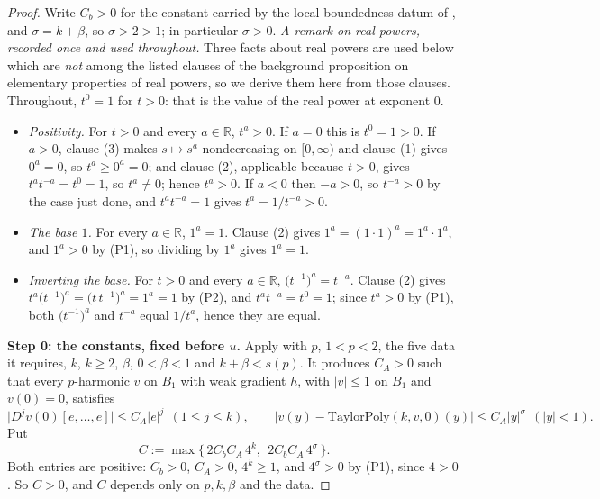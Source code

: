 \begin{proof}
Write $C_b>0$ for the constant carried by the local boundedness datum of
, and $\sigma=k+\beta$, so $\sigma>2>1$; in particular
$\sigma>0$.
\medskip\noindent\emph{A remark on real powers, recorded once and used throughout.}  Three
facts about real powers are used below which are \emph{not} among the listed clauses of the
background proposition on elementary properties of real powers, so we derive them here from
those clauses.  Throughout, $t^{0}=1$ for $t>0$: that is the value of the real power at
exponent $0$.
\begin{itemize}
\item[(P1)] \emph{Positivity.}  For $t>0$ and every $a\in\mathbb{R}$, $t^{a}>0$.  If $a=0$ this
is $t^{0}=1>0$.  If $a>0$, clause (3) makes $s\mapsto s^{a}$ nondecreasing on $[0,\infty)$ and
clause (1) gives $0^{a}=0$, so $t^{a}\ge0^{a}=0$; and clause (2), applicable because $t>0$,
gives $t^{a}t^{-a}=t^{0}=1$, so $t^{a}\ne0$; hence $t^{a}>0$.  If $a<0$ then $-a>0$, so
$t^{-a}>0$ by the case just done, and $t^{a}t^{-a}=1$ gives $t^{a}=1/t^{-a}>0$.
\item[(P2)] \emph{The base $1$.}  For every $a\in\mathbb{R}$, $1^{a}=1$.  Clause (2) gives
$1^{a}=(1\cdot1)^{a}=1^{a}\cdot1^{a}$, and $1^{a}>0$ by (P1), so dividing by $1^{a}$ gives
$1^{a}=1$.
\item[(P3)] \emph{Inverting the base.}  For $t>0$ and every $a\in\mathbb{R}$,
$\bigl(t^{-1}\bigr)^{a}=t^{-a}$.  Clause (2) gives
$t^{a}\bigl(t^{-1}\bigr)^{a}=\bigl(t\,t^{-1}\bigr)^{a}=1^{a}=1$ by (P2), and
$t^{a}t^{-a}=t^{0}=1$; since $t^{a}>0$ by (P1), both $\bigl(t^{-1}\bigr)^{a}$ and $t^{-a}$
equal $1/t^{a}$, hence they are equal.
\end{itemize}


\medskip\noindent\textbf{Step 0: the constants, fixed before $u$.}
Apply  with $p$, $1<p<2$, the five data it requires, $k$, $k\ge2$,
$\beta$, $0<\beta<1$ and $k+\beta<s(p)$.  It produces $C_A>0$ such that every
$p$-harmonic $v$ on $B_1$ with weak gradient $h$, with $\lvert v\rvert\le1$ on $B_1$ and
$v(0)=0$, satisfies
\begin{equation}\label{eq:jb-approx}
  \bigl\lvert D^{j}v(0)[e,\ldots,e]\bigr\rvert\le C_A\lvert e\rvert^{j}\ \ (1\le j\le k),
  \qquad
  \bigl\lvert v(y)-\mathrm{TaylorPoly}(k,v,0)(y)\bigr\rvert\le C_A\lvert y\rvert^{\sigma}
    \ \ (\lvert y\rvert<1).
\end{equation}
Put
\[
  C:=\max\bigl\{\,2C_bC_A\,4^{k},\ \ 2C_bC_A\,4^{\sigma}\,\bigr\}.
\]
Both entries are positive: $C_b>0$, $C_A>0$, $4^{k}\ge1$, and $4^{\sigma}>0$ by (P1), since
$4>0$.  So $C>0$, and $C$ depends only on $p,k,\beta$ and the data.


\end{proof}
